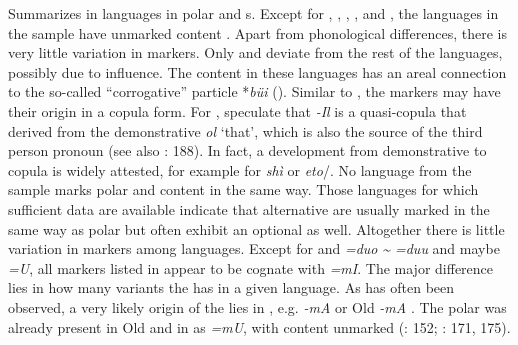  Summarizes  in  languages in polar and s. Except for , , , , and , the  languages in the sample have unmarked content . Apart from phonological differences, there is very little variation in  markers. Only  and  deviate from the rest of the languages, possibly due to  influence. The content  in these  languages has an areal connection to the so-called  “corrogative” particle *\textit{büi} (). Similar to , the  markers may have their origin in a copula form. For , \citet[88]{AndersonHarrison1999} speculate that \textit{-Il} is a quasi-copula that derived from the demonstrative \textit{ol} ‘that’, which is also the source of the third person  pronoun (see also \citealt{Ragagnin2011}: 188). In fact, a development from demonstrative to copula is widely attested, for example for  \textit{shì}  or  \textit{eto}/. No  language from the sample marks polar and content  in the same way. Those languages for which sufficient data are available indicate that alternative  are usually marked in the same way as polar  but often exhibit an optional  as well. Altogether there is little variation in  markers among  languages. Except for  and  \textit{=duo} \textit{{\textasciitilde} =duu} and maybe  \textit{=U}, all  markers listed in  appear to be cognate with  \textit{=mI}. The major difference lies in how many variants the  has in a given language. As has often been observed, a very likely origin of the  lies in , e.g.  \textit{-mA} or Old  \textit{-mA} \citep[151]{Erdal1998}. The polar  was already present in Old  and in  as \textit{=mU}, with content  unmarked (\citealt{Erdal1998}: 152; \citealt{BoeschotenVandamme1998}: 171, 175).

